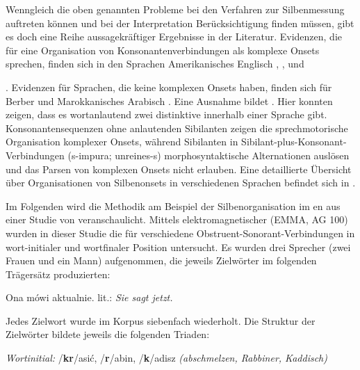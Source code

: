   
Wenngleich die oben genannten Probleme bei den Verfahren zur Silbenmessung auftreten können und bei der Interpretation Berücksichtigung finden müssen, gibt es doch eine Reihe aussagekräftiger Ergebnisse in der Literatur. Evidenzen, die für eine Organisation von Konsonantenverbindungen als komplexe Onsets sprechen, finden sich in den Sprachen Amerikanisches Englisch \citep{Browman2000, Marin2010},  \citep{Kühnert2006},  \citep{Goldstein2007a} und { \citep{Mücke2010b}. Evidenzen für Sprachen, die keine komplexen Onsets haben, finden sich für  Berber \citep{Goldstein2007a, Hermes2011b, Hermes2011a} und Marokkanisches Arabisch \citep{Shaw2009}. Eine Ausnahme bildet . Hier konnten \citet{Hermes2008b} zeigen, dass es wortanlautend zwei distinktive  innerhalb einer Sprache gibt. Konsonantensequenzen ohne anlautenden Sibilanten zeigen die sprechmotorische Organisation komplexer Onsets, während Sibilanten in Sibilant-plus-Konsonant-Verbindungen (s-impura; unreines-s) morphosyntaktische Alternationen auslösen und das Parsen von komplexen Onsets nicht erlauben. Eine detaillierte Übersicht über Organisationen von Silbenonsets in verschiedenen Sprachen befindet sich in \citet{Hermes2017}.

\largerpage[2]
Im Folgenden wird die Methodik am Beispiel der Silbenorganisation im en aus einer Studie von \citet{Mücke2010b} veranschaulicht. Mittels elektromagnetischer  (EMMA, AG 100) wurden in dieser Studie die  für verschiedene Obstruent-Sonorant-Verbindungen in wort-initialer und wortfinaler Position untersucht. Es wurden drei Sprecher (zwei Frauen und ein Mann) aufgenommen, die jeweils Zielwörter im folgenden Trägersätz produzierten: 

\begin{exe}
	\label{ex:0310}
	\ex Ona mówi \longrule{} aktualnie.
	\sn lit.: \textit{Sie sagt \longrule{} jetzt.}
\end{exe}

\newpage 
Jedes Zielwort wurde im Korpus siebenfach wiederholt. Die Struktur der Zielwörter bildete jeweils die folgenden Triaden: 

\begin{exe}
	\label{ex:0311}
	\ex \textit{Wortinitial:} /\textbf{kr}/asić, /\textbf{r}/abin, /\textbf{k}/adisz
	\sn \textit{(abschmelzen, Rabbiner, Kaddisch)}
\end{exe}

}
